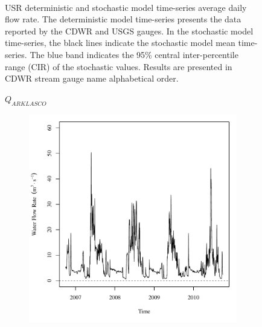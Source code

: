 \begin{linenumbers}
\begin{landscape}
\begin{figure}
\begin{subfigure}{0.7\textwidth}
		\end{subfigure}\\
		\caption[USR deterministic and stochastic model time-series average daily flow rate.]{USR deterministic and stochastic model time-series average daily flow rate.  The deterministic model time-series presents the data reported by the CDWR and USGS gauges.  In the stochastic model time-series, the black lines indicate the stochastic model mean time-series.  The blue band indicates the 95\% central inter-percentile range (CIR) of the stochastic values.  Results are presented in CDWR stream gauge name alphabetical order.}
		\label{fig:GaugeFlow_US}
	\end{figure}
\end{landscape}
\subfiguremid
\begin{landscape}
	\begin{figure}
		\centering
		$ Q_{ARKLASCO} $
		\begin{subfigure}{0.7\textwidth}
			\centering
			\includegraphics[width=\tableCustomSize]{"Figures/Results_USR/Deterministic/Q U201"}
		\end{subfigure}%
		\begin{subfigure}{0.7\textwidth}
			\centering

\end{subfigure}
\end{figure}
\end{landscape}
\end{linenumbers}
